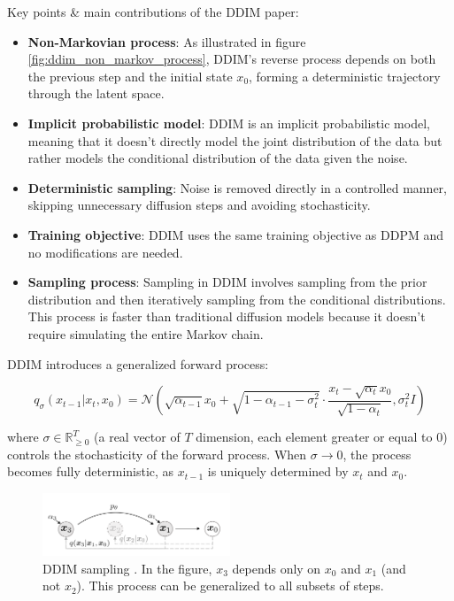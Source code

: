 Key points \& main contributions of the DDIM paper:

\begin{itemize}
    \item \textbf{Non-Markovian process}: As illustrated in figure \ref{fig:ddim_non_markov_process}, DDIM's reverse process depends on both the previous step and the initial state $x_0$, forming a deterministic trajectory through the latent space.
    \item \textbf{Implicit probabilistic model}: DDIM is an implicit probabilistic model, meaning that it doesn't directly model the joint distribution of the data but rather models the conditional distribution of the data given the noise.
    \item \textbf{Deterministic sampling}: Noise is removed directly in a controlled manner, skipping unnecessary diffusion steps and avoiding stochasticity.
    \item \textbf{Training objective}: DDIM uses the same training objective as DDPM and no modifications are needed.
    \item \textbf{Sampling process}: Sampling in DDIM involves sampling from the prior distribution and then iteratively sampling from the conditional distributions. This process is faster than traditional diffusion models because it doesn't require simulating the entire Markov chain.
\end{itemize}

DDIM introduces a generalized forward process:

\[
q_\sigma (x_{t-1} | x_t, x_0) = \mathcal{N} \left( \sqrt{\alpha_{t-1}} x_0 + \sqrt{1 - \alpha_{t-1} - \sigma_t^2} \cdot \frac{x_t - \sqrt{\alpha_t} x_0}{\sqrt{1 - \alpha_t}}, \sigma_t^2 I \right)
\]

where $\sigma \in \mathbb{R}^T_{\geq 0}$ (a real vector of $T$ dimension, each element greater or equal to 0) controls the stochasticity of the forward process. When $\sigma \rightarrow 0$, the process becomes fully deterministic, as $x_{t-1}$ is uniquely determined by $x_t$ and $x_0$.

\begin{figure}
    \centering
    \includegraphics[width=0.5\textwidth]{images/diffusion_models/stable_diffusion/ddim_sampling_process.png}
    \caption{DDIM sampling \cite{ddim}. In the figure, $x_3$ depends only on $x_0$ and $x_1$ (and not $x_2$). This process can be generalized to all subsets of steps.}
    \label{fig:ddim_sampling_process}
\end{figure}

